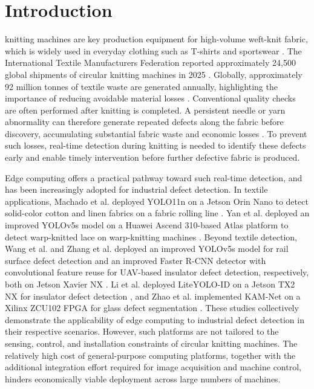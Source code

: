 \documentclass[journal]{IEEEtranTIE}
\begin{document}
\section{Introduction}
 knitting machines are key production equipment for high-volume weft-knit fabric, which is widely used in everyday clothing such as T-shirts and sportswear \cite{cottonworksKnitBasics,woolmarkCircularKnitting,cottonworksSingleDouble}. The International Textile Manufacturers Federation reported approximately 24,500 global shipments of circular knitting machines in 2025 \cite{itmf2025press}. Globally, approximately 92 million tonnes of textile waste are generated annually, highlighting the importance of reducing avoidable material losses \cite{unep2025textilewaste}. Conventional quality checks are often performed after knitting is completed. A persistent needle or yarn abnormality can therefore generate repeated defects along the fabric before discovery, accumulating substantial fabric waste and economic losses \cite{takeuchi2018knitted,akter2022material,xiang2023hooknet}. To prevent such losses, real-time detection during knitting is needed to identify these defects early and enable timely intervention before further defective fabric is produced.

Edge computing offers a practical pathway toward such real-time detection, and has been increasingly adopted for industrial defect detection. In textile applications, Machado et al. deployed YOLO11n on a Jetson Orin Nano to detect solid-color cotton and linen fabrics on a fabric rolling line \cite{machado2025edgefabric}. Yan et al. deployed an improved YOLOv5s model on a Huawei Ascend 310-based Atlas platform to detect warp-knitted lace on warp-knitting machines \cite{yan2026warplace}. Beyond textile detection, Wang et al. and Zhang et al. deployed an improved YOLOv5s model for rail surface defect detection and an improved Faster R-CNN detector with convolutional feature reuse for UAV-based insulator defect detection, respectively, both on Jetson Xavier NX \cite{wang2024rail,zhang2026uavedge}. Li et al. deployed LiteYOLO-ID on a Jetson TX2 NX for insulator defect detection \cite{li2024liteyolo}, and Zhao et al. implemented KAM-Net on a Xilinx ZCU102 FPGA for glass defect segmentation \cite{zhao2025kamnet}. These studies collectively demonstrate the applicability of edge computing to industrial defect detection in their respective scenarios. However, such platforms are not tailored to the sensing, control, and installation constraints of circular knitting machines. The relatively high cost of general-purpose computing platforms, together with the additional integration effort required for image acquisition and machine control, hinders economically viable deployment across large numbers of machines.
\end{document}
